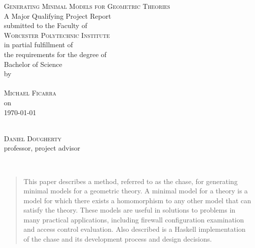\documentclass[11pt, a4paper]{article}
\begin{document}
\begin{titlepage}
\begin{center}
	\textsc{\huge Generating Minimal Models for Geometric Theories}\\[1cm]
	A Major Qualifying Project Report\\
	submitted to the Faculty of\\[0.7cm]
	\textsc{ \large Worcester Polytechnic Institute }\\[0.7cm]
	in partial fulfillment of\\
	the requirements for the degree of\\
	Bachelor of Science\\[1cm]
	by\\[1cm]
	~\hspace{2cm}\dotfill\hspace{2cm}~\\
	\textsc{\Large Michael Ficarra}\\[1cm]
	on\\[1cm]
	{\Large \today}\\
	\vfill
	\begin{flushright}
		\hspace{8cm}\dotfill \\
		\textsc{Daniel Dougherty}\\
		professor, project advisor\\
	\end{flushright}
\end{center}
\end{titlepage}


~\\
\vfill
\begin{abstract}
This paper describes a method, referred to as the chase, for generating minimal
models for a geometric theory. A minimal model for a theory is a model for
which there exists a homomorphism to any other model that can satisfy the
theory. These models are useful in solutions to problems in many practical
applications, including firewall configuration examination and access control
evaluation. Also described is a Haskell implementation of the chase and its
development process and design decisions.
\end{abstract}
\vfill
~\\
\newpage

\renewcommand{\contentsname}{Table of Contents}
\tableofcontents \newpage
\end{document}
